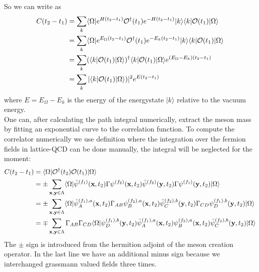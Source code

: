         So we can write  as
        \begin{equation}
            \begin{aligned}
                C(t_2 - t_1) &= \sum_k \langle\Omega|e^{H(t_2 - t_1)}\mathcal{O}^\dagger(t_1)e^{-H(t_2 - t_1)} |k\rangle\langle k| \mathcal{O}(t_1)|\Omega\rangle\\
                &= \sum_k \langle\Omega|e^{E_\Omega(t_2 - t_1)}\mathcal{O}^\dagger(t_1)e^{-E_k(t_2 - t_1)} |k\rangle\langle k| \mathcal{O}(t_1)|\Omega\rangle\\
                &= \sum_k (\langle k|\mathcal{O}(t_1) |\Omega\rangle)^\dagger\langle k| \mathcal{O}(t_1)|\Omega\rangle e^{(E_\Omega - E_k)(t_2 - t_1)}\\
                &= \sum_k |\langle k|\mathcal{O}(t_1) |\Omega\rangle)|^2 e^{E(t_2 - t_1)}\\
            \end{aligned}
        \end{equation}
        where $E = E_\Omega - E_k$ is the energy of the energystate $|k\rangle$ relative to the vacuum energy.\\
        
        One can, after calculating the path integral numerically, extract the meson mass by fitting an exponential curve to the correlation function.
        To compute the correlator numerically we use definition  where the integration over the fermion fields in lattice-QCD can be done manually, the integral will be neglected for the moment:
        \begin{equation}\label{correlation_in_t}
            \begin{aligned}
                C(t_2 - t_1) &= \langle\Omega|\mathcal{O}^\dagger(t_2)\mathcal{O}(t_1)|\Omega\rangle\\
                &= \pm \sum_{\textbf{x},\textbf{y}\in\Lambda}
                \langle\Omega|\bar{\psi}^{(f_1)}(\textbf{x},t_2)\Gamma\psi^{(f_2)}(\textbf{x},t_2)
                \bar{\psi}^{(f_2)}(\textbf{y},t_2)\Gamma\psi^{(f_1)}(\textbf{y},t_2)|\Omega\rangle\\
                &= \pm \sum_{\textbf{x},\textbf{y}\in\Lambda}
                \langle\Omega|\bar{\psi}_A^{(f_1),a}(\textbf{x},t_2)\Gamma_{AB}\psi_B^{(f_2),a}(\textbf{x},t_2)
                \bar{\psi}^{(f_2),b}_C(\textbf{y},t_2)\Gamma_{CD}\psi_D^{(f_1),b}(\textbf{y},t_2)|\Omega\rangle\\
                &= \mp \sum_{\textbf{x},\textbf{y}\in\Lambda}\Gamma_{AB}\Gamma_{CD}
                \langle\Omega|\psi_D^{(f_1),b}(\textbf{y},t_2)\bar{\psi}_A^{(f_1),a}(\textbf{x},t_2)
                \psi_B^{(f_2),a}(\textbf{x},t_2)\bar{\psi}^{(f_2),b}_C(\textbf{y},t_2)|\Omega\rangle
            \end{aligned}
        \end{equation}
        The $\pm$ sign is introduced from the hermition adjoint  of the meson creation operator. In the last line we have an additional minus sign because we interchanged grassmann valued fields three times.\\
        
